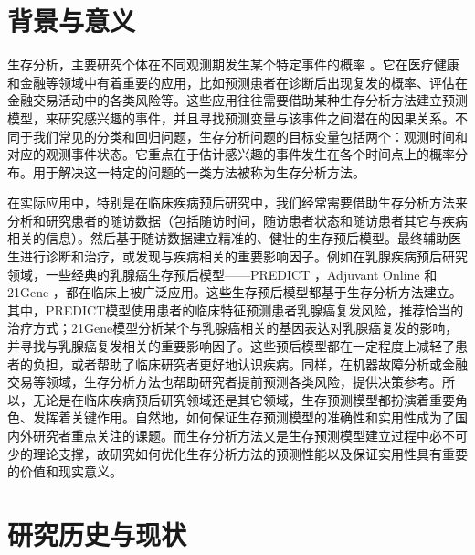 \thesischapterexordium

\section{背景与意义}

生存分析，主要研究个体在不同观测期发生某个特定事件的概率 。它在医疗健康和金融等领域中有着重要的应用，比如预测患者在诊断后出现复发的概率、评估在金融交易活动中的各类风险等。这些应用往往需要借助某种生存分析方法建立预测模型，来研究感兴趣的事件，并且寻找预测变量与该事件之间潜在的因果关系。不同于我们常见的分类和回归问题，生存分析问题的目标变量包括两个：观测时间和对应的观测事件状态。它重点在于估计感兴趣的事件发生在各个时间点上的概率分布。用于解决这一特定的问题的一类方法被称为生存分析方法。

在实际应用中，特别是在临床疾病预后研究中，我们经常需要借助生存分析方法来分析和研究患者的随访数据（包括随访时间，随访患者状态和随访患者其它与疾病相关的信息）。然后基于随访数据建立精准的、健壮的生存预后模型。最终辅助医生进行诊断和治疗，或发现与疾病相关的重要影响因子。例如在乳腺疾病预后研究领域，一些经典的乳腺癌生存预后模型——PREDICT ，Adjuvant Online  和21Gene ，都在临床上被广泛应用。这些生存预后模型都基于生存分析方法建立。其中，PREDICT模型使用患者的临床特征预测患者乳腺癌复发风险，推荐恰当的治疗方式；21Gene模型分析某个与乳腺癌相关的基因表达对乳腺癌复发的影响，并寻找与乳腺癌复发相关的重要影响因子。这些预后模型都在一定程度上减轻了患者的负担，或者帮助了临床研究者更好地认识疾病。同样，在机器故障分析或金融交易等领域，生存分析方法也帮助研究者提前预测各类风险，提供决策参考。所以，无论是在临床疾病预后研究领域还是其它领域，生存预测模型都扮演着重要角色、发挥着关键作用。自然地，如何保证生存预测模型的准确性和实用性成为了国内外研究者重点关注的课题。而生存分析方法又是生存预测模型建立过程中必不可少的理论支撑，故研究如何优化生存分析方法的预测性能以及保证实用性具有重要的价值和现实意义。

\section{研究历史与现状}

